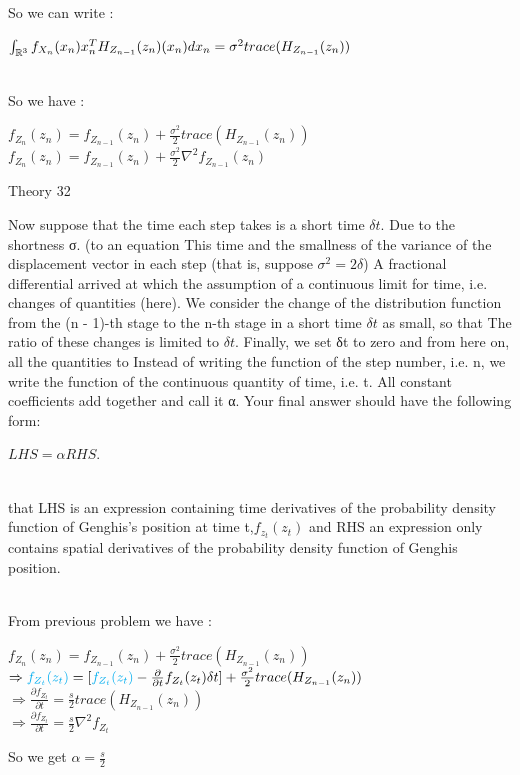 \documentclass[30pt]{article}
\begin{document}
So we can write : \\
\begin{center}
    $\int_{\Bbb{R}^3}f_{X_n}(x_n)x_n^T H_{Z_{n-1}}(z_n)(x_n) dx_n = \sigma^2 trace(H_{Z_{n-1}}(z_n)) $
\end{center} \\
So we have : \\
\begin{center}
    $f_{Z_n} (z_n) =  f_{Z_{n-1}}(z_n) + \frac{\sigma^2}{2}trace(H_{Z_{n-1}}(z_n)) $ \vspace{0.3cm} \\
    $f_{Z_n} (z_n) =  f_{Z_{n-1}}(z_n) + \frac{\sigma^2}{2} \nabla^2 f_{Z_{n-1}}(z_n) $
\end{center}

{\Large \color{blue} Theory 32 } \\
{\color{blue} Now suppose that the time each step takes is a short time $\delta t$. Due to the shortness
σ. (to an equation
This time and the smallness of the variance of the displacement vector in each step (that is, suppose $\sigma^2 = 2 \delta$)
A fractional differential arrived at which the assumption of a continuous limit for time, i.e. changes of quantities (here).
We consider the change of the distribution function from the (n - 1)-th stage to the n-th stage in a short time $\delta t$ as small, so that
The ratio of these changes is limited to $\delta t$. Finally, we set δt to zero and from here on, all the quantities to
Instead of writing the function of the step number, i.e. n, we write the function of the continuous quantity of time, i.e. t. All constant coefficients
add together and call it α. Your final answer should have the following form:\\
\begin{center}
    $LHS = \alpha RHS.$
\end{center}\\
that LHS is an expression containing time derivatives of the probability density function of Genghis's position at time t,$f_{z_t}(z_t)$ and RHS an expression only contains spatial derivatives of the probability density function of Genghis position.} \\ \newline 
From previous problem we have : \\
\begin{center}
    $f_{Z_n} (z_n) =  f_{Z_{n-1}}(z_n) + \frac{\sigma^2}{2}trace(H_{Z_{n-1}}(z_n)) $ \vspace{0.3cm}\\
    $\Rightarrow {\color{cyan} f_{Z_t} (z_t)} = [{\color{cyan} f_{Z_t} (z_t)} - \frac{\partial}{\partial t}f_{Z_t} (z_t)\delta t ] + \frac{\sigma^2}{2}trace(H_{Z_{n-1}}(z_n)) $ \vspace{0.3cm} \\
    $\Rightarrow \frac{\partial f_{Z_t}}{\partial t} = \frac{s}{2}trace(H_{Z_{n-1}}(z_n)) $ \vspace{0.3cm} \\
    $\Rightarrow \frac{\partial f_{Z_t}}{\partial t} = \frac{s}{2}\nabla^2 f_{Z_t} $
\end{center}
So we get $\alpha = \frac{s}{2}$ \\
\end{document}
